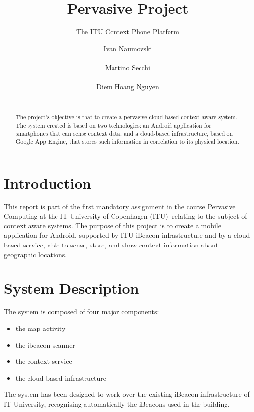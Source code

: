 \documentclass{sigchi}
\begin{document}
\title{Pervasive Project}
\subtitle{The ITU Context Phone Platform}

\author{
  \alignauthor Ivan Naumovski\\
    \\
  \alignauthor Martino Secchi\\
    \\
  \alignauthor Diem Hoang Nguyen\\
    \\
}

\maketitle

\begin{abstract}
The project's objective is that to create a pervasive cloud-based context-aware system. 
The system created is based on two technologies: an Android application for smartphones that can sense context data, and a cloud-based infrastructure, based on Google App Engine, that stores such information in correlation to its physical location.
\end{abstract}



\section{Introduction}
This report is part of the first mandatory assignment in the course Pervasive Computing at the IT-University of Copenhagen (ITU), relating to the subject of context aware systems.
 The purpose of this project is to create a mobile application for Android, supported by ITU iBeacon infrastructure and by a  cloud based service, able to sense, store, and show context information about geographic locations. 
 
 \section{System Description}

The system is composed of four major components:
\begin{itemize}
\item the map activity
\item the ibeacon scanner
\item the context service
\item the cloud based infrastructure
\end{itemize}
The system has been designed to work over the existing iBeacon infrastructure of IT University, recognising automatically the iBeacons used in the building.
\end{document}
